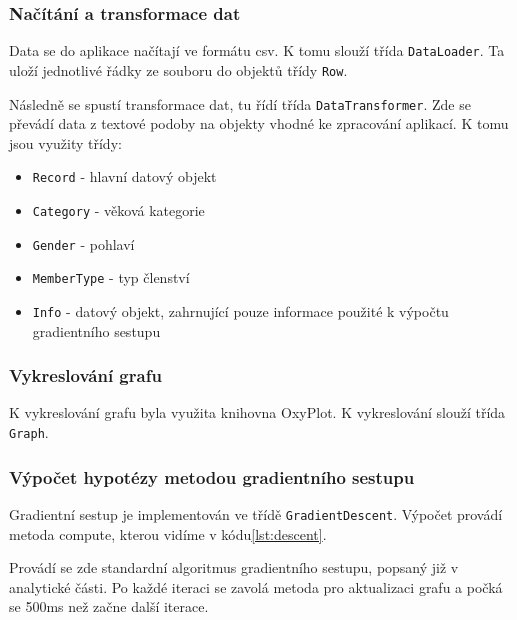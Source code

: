 \documentclass[a4paper,12pt]{article}
\begin{document}
\subsubsection{Načítání a transformace dat}
Data se do aplikace načítají ve formátu csv. K tomu slouží třída \texttt{DataLoader}. Ta uloží jednotlivé řádky ze souboru do objektů třídy \texttt{Row}.

Následně se spustí transformace dat, tu řídí třída \texttt{DataTransformer}. Zde se převádí data z textové podoby na objekty vhodné ke zpracování aplikací. K tomu jsou využity třídy:

\begin{itemize}
\item \texttt{Record} - hlavní datový objekt
\item \texttt{Category} - věková kategorie
\item \texttt{Gender} - pohlaví
\item \texttt{MemberType} - typ členství
\item \texttt{Info} - datový objekt, zahrnující pouze informace použité k výpočtu gradientního sestupu
\end{itemize}

\subsubsection{Vykreslování grafu}
K vykreslování grafu byla využita knihovna OxyPlot\cite{oxyplot}. K vykreslování slouží třída \texttt{Graph}.

\subsubsection{Výpočet hypotézy metodou gradientního sestupu}
Gradientní sestup je implementován ve třídě \texttt{GradientDescent}. Výpočet provádí metoda compute, kterou vidíme v kódu\ref{lst:descent}. 

Provádí se zde standardní algoritmus gradientního sestupu, popsaný již v analytické části. Po každé iteraci se zavolá metoda pro aktualizaci grafu a počká se 500ms než začne další iterace.
\end{document}

